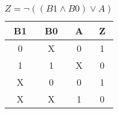 
\begin{center}
    \begin{table}[h] \caption{\(Z = \lnot ((B1 \land B0) \lor A) \)}
        \begin{center}
            \begin{tabular}{|c|c|c||c|} \hline
            B1 & B0 & A & Z \\ \hline\hline
            0  & X  & 0 & 1 \\ \hline
            1  & 1  & X & 0 \\ \hline
            X  & 0  & 0 & 1 \\ \hline
            X  & X  & 1 & 0 \\ \hline
            \end{tabular}
        \end{center}
    \end{table}
\end{center}
